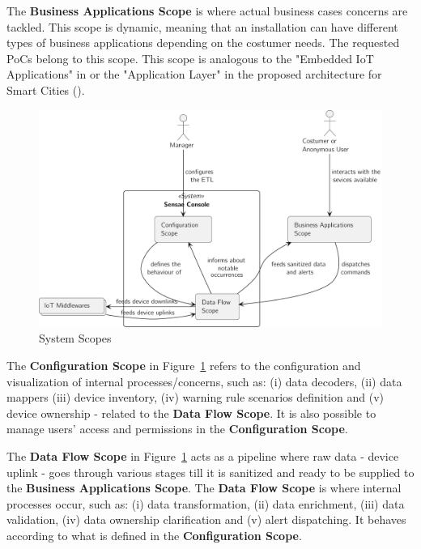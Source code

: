 The \textbf{Business Applications Scope} is where actual business cases concerns are tackled. This scope is dynamic, meaning that an installation can have different types of business applications depending on the costumer needs. The requested \gls{PoC}s belong to this scope. This scope is analogous to the "Embedded IoT Applications" in  or the "Application Layer" in the proposed architecture for Smart Cities ().

\begin{figure}[H]
   \centering
   \includegraphics[page=1,width=\columnwidth]{assets/diagrams/design/scopes.pdf}
   \caption[System Scopes]{System Scopes}
   \label{fig:design:system_scopes:scopes}
\end{figure}

The \textbf{Configuration Scope} in Figure~\ref{fig:design:system_scopes:scopes} refers to the configuration and visualization of internal processes/concerns, such as: (i) data decoders, (ii) data mappers (iii) device inventory, (iv) warning rule scenarios definition and (v) device ownership - related to the \textbf{Data Flow Scope}. It is also possible to manage users' access and permissions in the \textbf{Configuration Scope}.

The \textbf{Data Flow Scope} in Figure~\ref{fig:design:system_scopes:scopes} acts as a pipeline where raw data - device uplink - goes through various stages till it is sanitized and ready to be supplied to the \textbf{Business Applications Scope}. The \textbf{Data Flow Scope} is where internal processes occur, such as: (i) data transformation, (ii) data enrichment, (iii) data validation, (iv) data ownership clarification and (v) alert dispatching. It behaves according to what is defined in the \textbf{Configuration Scope}.

